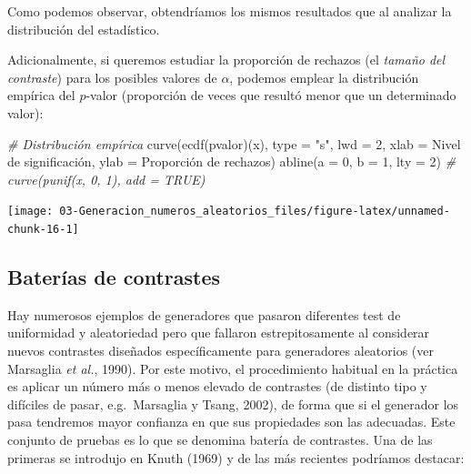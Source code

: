 \documentclass[
]{book}
\newenvironment{Shaded}{\begin{snugshade}}{\end{snugshade}}
\newcommand{\AttributeTok}[1]{\textcolor[rgb]{0.77,0.63,0.00}{#1}}
\newcommand{\CommentTok}[1]{\textcolor[rgb]{0.56,0.35,0.01}{\textit{#1}}}
\newcommand{\DecValTok}[1]{\textcolor[rgb]{0.00,0.00,0.81}{#1}}
\newcommand{\FunctionTok}[1]{\textcolor[rgb]{0.00,0.00,0.00}{#1}}
\newcommand{\NormalTok}[1]{#1}
\newcommand{\StringTok}[1]{\textcolor[rgb]{0.31,0.60,0.02}{#1}}
\theoremstyle{break}
\theoremstyle{definition}
\theoremstyle{definition}
\theoremstyle{definition}
\theoremstyle{definition}
\theoremstyle{remark}
\begin{document}
Como podemos observar, obtendríamos los mismos resultados que al analizar la distribución del estadístico.

Adicionalmente, si queremos estudiar la proporción de rechazos (el \emph{tamaño del contraste}) para los posibles valores de \(\alpha\), podemos emplear la distribución empírica del \(p\)-valor (proporción de veces que resultó menor que un determinado valor):

\begin{Shaded}
\begin{Highlighting}[]
\CommentTok{\# Distribución empírica}
\FunctionTok{curve}\NormalTok{(}\FunctionTok{ecdf}\NormalTok{(pvalor)(x), }\AttributeTok{type =} \StringTok{"s"}\NormalTok{, }\AttributeTok{lwd =} \DecValTok{2}\NormalTok{, }
      \AttributeTok{xlab =} \StringTok{\textquotesingle{}Nivel de significación\textquotesingle{}}\NormalTok{, }\AttributeTok{ylab =} \StringTok{\textquotesingle{}Proporción de rechazos\textquotesingle{}}\NormalTok{)}
\FunctionTok{abline}\NormalTok{(}\AttributeTok{a =} \DecValTok{0}\NormalTok{, }\AttributeTok{b =} \DecValTok{1}\NormalTok{, }\AttributeTok{lty =} \DecValTok{2}\NormalTok{)   }\CommentTok{\# curve(punif(x, 0, 1), add = TRUE)}
\end{Highlighting}
\end{Shaded}

\begin{center}\texttt{[image: 03-Generacion\_numeros\_aleatorios\_files/figure-latex/unnamed-chunk-16-1]} \end{center}

\hypertarget{baterias}{%
\subsection{Baterías de contrastes}\label{baterias}}

Hay numerosos ejemplos de generadores que pasaron diferentes test de uniformidad y aleatoriedad pero que fallaron estrepitosamente al considerar nuevos contrastes diseñados específicamente para generadores aleatorios (ver Marsaglia \emph{et al.}, 1990).
Por este motivo, el procedimiento habitual en la práctica es aplicar un número más o menos elevado de contrastes (de distinto tipo y difíciles de pasar, e.g.~Marsaglia y Tsang, 2002), de forma que si el generador los pasa tendremos mayor confianza en que sus propiedades son las adecuadas.
Este conjunto de pruebas es lo que se denomina batería de contrastes. Una de las primeras se introdujo en Knuth (1969) y de las más recientes podríamos destacar:
\end{document}
